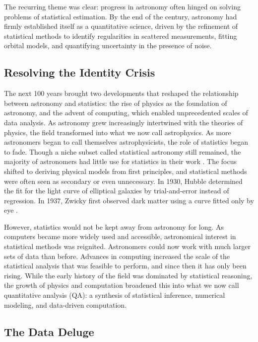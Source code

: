 \documentclass[preprint2,linenumbers,longauthor]{aastex631}
\begin{document}
The recurring theme was clear: progress in astronomy often hinged on solving problems of statistical estimation. By the end of the century, astronomy had firmly established itself as a quantitative science, driven by the refinement of statistical methods to identify regularities in scattered measurements, fitting orbital models, and quantifying uncertainty in the presence of noise.

\subsection{Resolving the Identity Crisis}

The next 100 years brought two developments that reshaped the relationship between astronomy and statistics: the rise of physics as the foundation of astronomy, and the advent of computing, which enabled unprecedented scales of data analysis. As astronomy grew increasingly intertwined with the theories of physics, the field transformed into what we now call astrophysics. As more astronomers began to call themselves astrophysicists, the role of statistics began to fade. Though a niche subset called statistical astronomy still remained, the majority of astronomers had little use for statistics in their work \citep{feigelsonStatisticalChallengesModern2004}. The focus shifted to deriving physical models from first principles, and statistical methods were often seen as secondary or even unnecessary. In 1930, Hubble determined the fit for the light curve of elliptical galaxies by trial-and-error instead of regression. In 1937, Zwicky first observed dark matter using a curve fitted only by eye \citep{feigelson21stCenturyStatistical2021}.

However, statistics would not be kept away from astronomy for long. As computers became more widely used and accessible, astronomical interest in statistical methods was reignited. Astronomers could now work with much larger sets of data than before. Advances in computing increased the scale of the statistical analysis that was feasible to perform, and since then it has only been rising. While the early history of the field was dominated by statistical reasoning, the growth of physics and computation broadened this into what we now call quantitative analysis (QA): a synthesis of statistical inference, numerical modeling, and data-driven computation.

\subsection{The Data Deluge}
\end{document}
